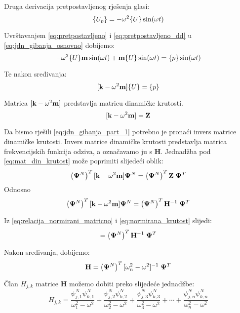 Druga derivacija pretpostavljenog rješenja glasi:
\begin{equation}\label{eq:pretpostavljeno_dd}
    \vtor{U_p}{}=-\omega^2\vtor{U}{}\sin(\omega t)
\end{equation}

Uvrštavanjem \eqref{eq:pretpostavljeno} i \eqref{eq:pretpostavljeno_dd} u
\eqref{eq:jdn_gibanja_osnovno} dobijemo:
\begin{equation}
    -\omega^2\vtor{U}{}\mm\sin(\omega t) + \mm\vtor{U}{}\sin(\omega t) = \vtor{p}{}\sin(\omega t)
\end{equation}

Te nakon sređivanja:
\begin{equation}\label{eq:jdn_gibanja_part_1}
    [\kk-\omega^2\mm]\vtor{U}{}=\vtor{p}{}
\end{equation}

Matrica $[\mathbf{k}-\omega^2\mathbf{m}]$ predstavlja matricu dinamičke krutosti.
\begin{equation}\label{eq:mat_din_krutost}
    [\mathbf{k}-\omega^2\mathbf{m}]=\mathbf{Z}
\end{equation}

Da bismo rješili \eqref{eq:jdn_gibanja_part_1} potrebno je pronaći invers matrice
dinamičke krutosti. Invers matrice dinamičke krutosti predstavlja matrica
frekvencijskih funkcija odziva, a označavamo ju s $\mathbf{H}$. Jednadžba pod 
\eqref{eq:mat_din_krutost} može poprimiti slijedeći oblik:
\begin{equation}
    \left(\mathbf{\Psi}^N\right)^T[\mathbf{k}-\omega^2\mathbf{m}]\mathbf{\Psi}^N
    =
    \left(\mathbf{\Psi}^N\right)^T\mathbf{Z}\;\mathbf{\Psi}^T
\end{equation}
Odnosno
\begin{equation}
     \left(\mathbf{\Psi}^N\right)^T[\mathbf{k}-\omega^2\mathbf{m}]\mathbf{\Psi}^N
    =
    \left(\mathbf{\Psi}^N\right)^T\mathbf{H}^{-1}\;\mathbf{\Psi}^T
\end{equation}

Iz \eqref{eq:relacija_normirani_matricno} i \eqref{eq:normirana_krutost} slijedi:
\begin{equation}
    [\omega_n^2 - \omega^2] = \left(\ppsi^N\right)^T\mathbf{H}^{-1}\;\ppsi^T
\end{equation}

Nakon sređivanja, dobijemo:
\begin{equation}
    \mathbf{H}=\left(\mathbf{\Psi}^N\right)^T[\omega_n^2 - \omega^2]^{-1}\;\mathbf{\Psi}^T
\end{equation}

Član $H_{j,k}$ matrice $\mathbf{H}$ možemo dobiti preko slijedeće jednadžbe:
\begin{equation}\label{eq:clan_frf_matrice}
    H_{j,k}=\frac{\psi^N_{j,1}\psi^N_{k,1}}{\omega_1^2-\omega^2}
            +
            \frac{\psi^N_{j,2}\psi^N_{k,2}}{\omega_2^2-\omega^2}
            +
            \frac{\psi^N_{j,3}\psi^N_{k,3}}{\omega_3^2-\omega^2}
            +
            \cdots
            +
            \frac{\psi^N_{j,n}\psi^N_{k,n}}{\omega_n^2-\omega^2}
\end{equation}

